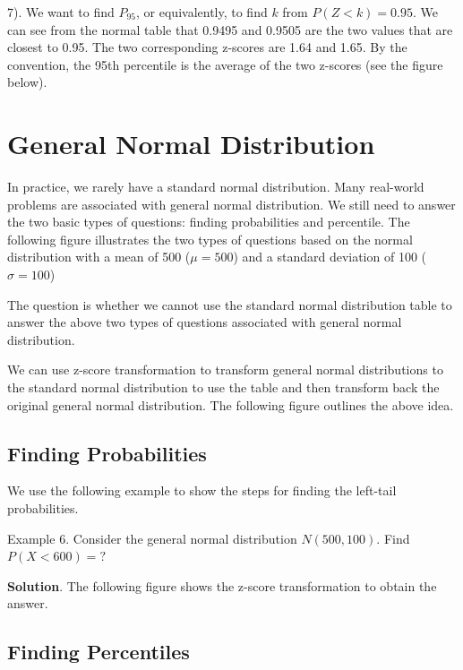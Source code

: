 \documentclass[
]{book}
\begin{document}
7). We want to find \(P_{95}\), or equivalently, to find \(k\) from \(P(Z < k) = 0.95\). We can see from the normal table that 0.9495 and 0.9505 are the two values that are closest to 0.95. The two corresponding z-scores are 1.64 and 1.65. By the convention, the 95th percentile is the average of the two z-scores (see the figure below).

\hfill\break

\hfill\break

\hypertarget{general-normal-distribution}{%
\section{General Normal Distribution}\label{general-normal-distribution}}

\hfill\break

In practice, we rarely have a standard normal distribution. Many real-world problems are associated with general normal distribution. We still need to answer the two basic types of questions: finding probabilities and percentile. The following figure illustrates the two types of questions based on the normal distribution with a mean of 500 (\(\mu = 500\)) and a standard deviation of 100 (\(\sigma = 100\))

The question is whether we cannot use the standard normal distribution table to answer the above two types of questions associated with general normal distribution.

We can use z-score transformation to transform general normal distributions to the standard normal distribution to use the table and then transform back the original general normal distribution. The following figure outlines the above idea.

\hypertarget{finding-probabilities-1}{%
\subsection{Finding Probabilities}\label{finding-probabilities-1}}

We use the following example to show the steps for finding the left-tail probabilities.

Example 6. Consider the general normal distribution \(N(500, 100)\). Find \(P(X < 600) = ?\)

\textbf{Solution}. The following figure shows the z-score transformation to obtain the answer.

\hypertarget{finding-percentiles-1}{%
\subsection{Finding Percentiles}\label{finding-percentiles-1}}
\end{document}
